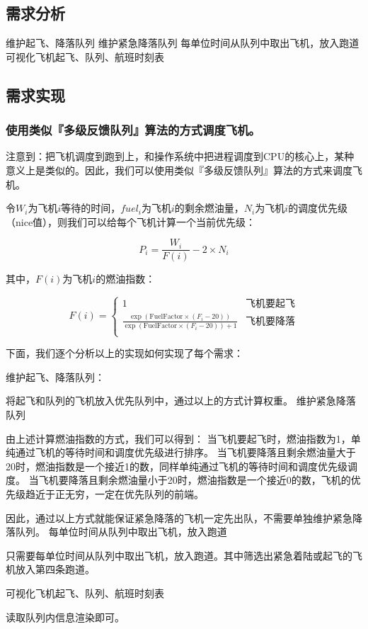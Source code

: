 \documentclass{ctexart}
\begin{document}
\subsection{需求分析}
\begin{outline}
    \1 维护起飞、降落队列
    \1 维护紧急降落队列
    \1 每单位时间从队列中取出飞机，放入跑道
    \1 可视化飞机起飞、队列、航班时刻表
\end{outline}
\subsection{需求实现}
\subsubsection{使用类似『多级反馈队列』算法的方式调度飞机。}

注意到：把飞机调度到跑到上，和操作系统中把进程调度到CPU的核心上，某种意义上是类似的。因此，我们可以使用类似『多级反馈队列』算法的方式来调度飞机。

令$W_i$为飞机$i$等待的时间，$fuel_i$为飞机$i$的剩余燃油量，$N_i$为飞机$i$的调度优先级（nice值），则我们可以给每个飞机计算一个当前优先级：

\begin{equation*}
    P_i = \frac{W_i}{F(i)} - 2 \times N_i
\end{equation*}

其中，$F(i)$为飞机$i$的燃油指数：

\begin{equation*}
    F(i) = \begin{cases}
        1 & \text{飞机要起飞} \\
        \frac{\exp(\mathrm{FuelFactor} \times (F_i - 20))}{\exp(\mathrm{FuelFactor} \times (F_i - 20)) + 1} & \text{飞机要降落} \\
    \end{cases}
\end{equation*}

下面，我们逐个分析以上的实现如何实现了每个需求：

\begin{outline}
    \1 维护起飞、降落队列：

        将起飞和队列的飞机放入优先队列中，通过以上的方式计算权重。
    \1 维护紧急降落队列

        由上述计算燃油指数的方式，我们可以得到：
        \2 当飞机要起飞时，燃油指数为1，单纯通过飞机的等待时间和调度优先级进行排序。
        \2 当飞机要降落且剩余燃油量大于20时，燃油指数是一个接近1的数，同样单纯通过飞机的等待时间和调度优先级调度。
        \2 当飞机要降落且剩余燃油量小于20时，燃油指数是一个接近0的数，飞机的优先级趋近于正无穷，一定在优先队列的前端。

        因此，通过以上方式就能保证紧急降落的飞机一定先出队，不需要单独维护紧急降落队列。
    \1 每单位时间从队列中取出飞机，放入跑道

        只需要每单位时间从队列中取出飞机，放入跑道。其中筛选出紧急着陆或起飞的飞机放入第四条跑道。

    \1 可视化飞机起飞、队列、航班时刻表

        读取队列内信息渲染即可。
\end{outline}
\end{document}
